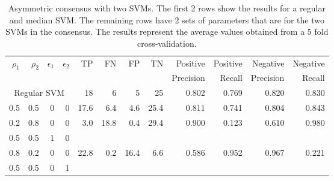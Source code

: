 \begin{table}[htbp]\label{table:HeartDisease2}
  \centering
    \begin{tabular}{rrrr|rrrrrrrr}
    \hline
    \multirow{2}{*}{$\rho_1$} & \multirow{2}{*}{$\rho_2$} & \multirow{2}{*}{$\epsilon_1$} & \multirow{2}{*}{$\epsilon_2$} & \multirow{2}{*}{TP}    & \multirow{2}{*}{FN}    & \multirow{2}{*}{FP}    & \multirow{2}{*}{TN} & Positive & Positive & Negative & Negative\\
    &&&&&&&&  Precision &  Recall &  Precision &  Recall \bigstrut\\
    \hline
    \hline
   \multicolumn{4}{c|}{Regular SVM} & 18    & 6     & 5     & 25    & 0.802 & 0.769 & 0.820 & 0.830 \bigstrut\\
    \hline
    0.5   & 0.5   & 0     & 0     & 17.6  & 6.4   & 4.6   & 25.4  & 0.811 & 0.741 & 0.804 & 0.843 \bigstrut\\
    \hline
    0.2   & 0.8   & 0     & 0     & 3.0   & 18.8  & 0.4   & 29.4  & 0.900 & 0.123 & 0.610 & 0.980 \bigstrut[t]\\
    0.5   & 0.5   & 1     & 0     &       &       &       &       &       &       &       &  \bigstrut[b]\\
    \hline
    0.8   & 0.2   & 0     & 0     & 22.8  & 0.2   & 16.4  & 6.6   & 0.586 & 0.952 & 0.967 & 0.221 \bigstrut[t]\\
    0.5   & 0.5   & 0     & 1     &       &       &       &       &       &       &       &  \bigstrut[b]\\
    \hline
    \hline
    \end{tabular}%
    \caption{Asymmetric consensus with two SVMs. The first 2 rows show the results for a regular and median SVM. The remaining rows have 2 sets of parameters that are for the two SVMs in the consensus. The results represent the average values obtained from a 5 fold cross-validation.}
\end{table}%

